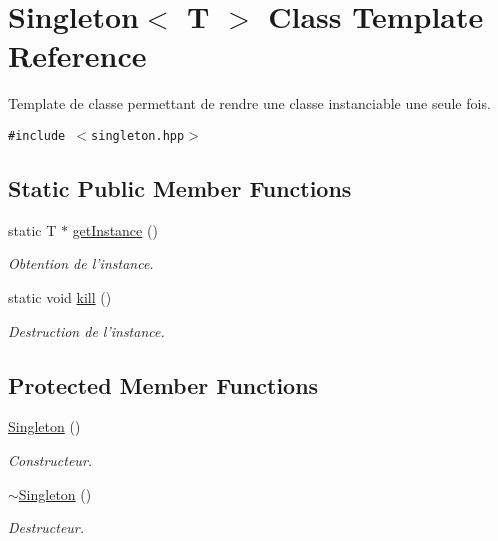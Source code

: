 \hypertarget{classSingleton}{
\section{Singleton$<$ T $>$ Class Template Reference}
\label{classSingleton}
}
Template de classe permettant de rendre une classe instanciable une seule fois.  


{\tt \#include $<$singleton.hpp$>$}

\subsection*{Static Public Member Functions}
\begin{CompactItemize}
\item 
static T $\ast$ \hyperlink{classSingleton_c7b8bd773889a70952cd00654e43bbe8}{getInstance} ()
\begin{CompactList}\small\item\em Obtention de l'instance. \item\end{CompactList}\item 
static void \hyperlink{classSingleton_a0372324492d74974b014b8d576737f3}{kill} ()
\begin{CompactList}\small\item\em Destruction de l'instance. \item\end{CompactList}\end{CompactItemize}
\subsection*{Protected Member Functions}
\begin{CompactItemize}
\item 
\hyperlink{classSingleton_923b995920da9c06590adb170ab2f890}{Singleton} ()
\begin{CompactList}\small\item\em Constructeur. \item\end{CompactList}\item 
\hyperlink{classSingleton_c6e7af82cba33f561bd64e5e0243e7f8}{$\sim$Singleton} ()
\begin{CompactList}\small\item\em Destructeur. \item\end{CompactList}\end{CompactItemize}


